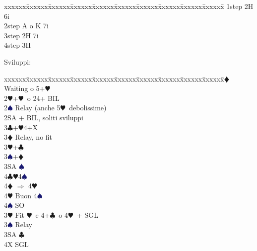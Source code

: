 \documentclass[a4paper,italian]{article}
\newcommand{\BC}{\textcolor{OliveGreen}{$\clubsuit$}}
\newcommand{\BD}{\textcolor{RedOrange}{$\vardiamondsuit$}}
\newcommand{\BH}{\textcolor{Red2}{$\varheartsuit${}}}
\newcommand{\BS}{\textcolor{MidnightBlue}{$\spadesuit${}}}
\newenvironment{bidtable}
{\begin{tabbing}

    xxxxxx\=xxxxxx\=xxxxxx\=xxxxxx\=xxxxxx\=xxxxxx\=xxxxxx\=xxxxxx\=xxxxxx\=xxxxxx\=\kill}
{\end{tabbing} }%
\newenvironment{varie}[1]
{\begin{tcolorbox}[colframe=green!40!black,title=#1]}
    {
\end{tcolorbox} }%
\begin{document}
\begin{multicols}{2}
\begin{varie}{(*) Relay richiesta onori}
                                            \begin{bidtable}
                                                1step \> 2H 6i\\
                                                2step \> A o K 7i\\
                                                3step \> 2H 7i\\
                                                4step \> 3H
                                            \end{bidtable}
                                        \end{varie}
                                        Sviluppi:
                                        \begin{bidtable}
                                            2\BD \> Waiting o 5+\BH \+\\
                                            2\BH {}+\BH\ o 24+ BIL\+\\
                                            2\BS \> Relay (anche 5\BH\ debolissime)\+\\
                                            2SA + BIL, soliti sviluppi\\
                                            3\BC {}+\BH4+X \+\\
                                            3\BD \> Relay, no fit\+\\
                                            3\BH {}+\BC \\
                                            3\BS {}+\BD \\
                                            3SA \BS \\
                                            4\BC {}\BH 4\BS \+\\
                                            4\BD \> $\Rightarrow$ 4\BH\\
                                            4\BH \> Buon 4\BS \\
                                            4\BS \> SO\-\-\\
                                            3\BH \> Fit \BH\ e 4+\BC\ o 4\BH\ + SGL\+\\
                                            3\BS \> Relay\+\\
                                            3SA \BC \\
                                            4X \> SGL\-\\

\end{bidtable}
\end{multicols}
\end{document}
